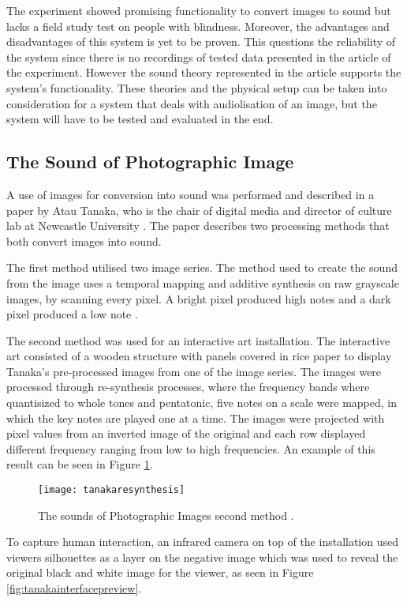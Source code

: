 The experiment showed promising functionality to convert images to sound but lacks a field study test on people with blindness. Moreover, the advantages and disadvantages of this system is yet to be proven. This questions the reliability of the system since there is no recordings of tested data presented in the article of the experiment. However the sound theory represented in the article supports the system's functionality. These theories and the physical setup can be taken into consideration for a system that deals with audiolisation of an image, but the system will have to be tested and evaluated in the end.

\subsection{The Sound of Photographic Image}\label{sec:soundarticle}
A use of images for conversion into sound was performed and described in a paper by Atau Tanaka, who is the chair of digital media and director of culture lab at Newcastle University \cite{Tanaka2012}. The paper describes two processing methods that both convert images into sound.

The first method utilised two image series. The method used to create the sound from the image uses a temporal mapping and additive synthesis on raw grayscale images, by scanning every pixel. A bright pixel produced high notes and a dark pixel produced a low note \cite{Tanaka2012}.

The second method was used for an interactive art installation. The interactive art consisted of a wooden structure with panels covered in rice paper to display Tanaka's pre-processed images from one of the image series. The images were processed through re-synthesis processes, where the frequency bands where quantisized to whole tones and pentatonic, five notes on a scale were mapped, in which the key notes are played one at a time. The images were projected with pixel values from an inverted image of the original and each row displayed different frequency ranging from low to high frequencies. An example of this result can be seen in Figure \ref{fig:tanakaresynthesis}. 

\begin{figure}[!h]
\centering
\texttt{[image: tanakaresynthesis]}
\caption{\label{fig:tanakaresynthesis}The sounds of Photographic Images second method \cite{Tanaka2012}.}
\end{figure}

To capture human interaction, an infrared camera on top of the installation used viewers silhouettes as a layer on the negative image which was used to reveal the original black and white image for the viewer, as seen in Figure \ref{fig:tanakainterfacepreview}.

